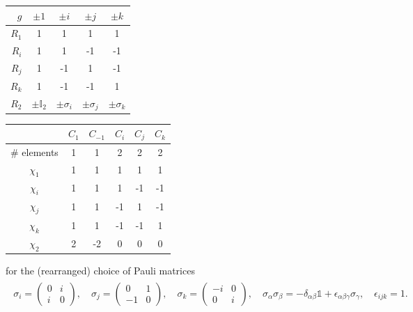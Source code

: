 \noindent
\begin{minipage}[t]{0.49\textwidth}
\centering
\begin{tabular}{|r||c|c|c|c|}
\hline
$g$ & $\pm 1$ & $\pm i$ & $\pm j$ & $\pm k$ \\
\hline\hline
$R_{1}$ & 1 & 1 & 1 & 1 \\
\hline
$R_{i}$ & 1 & 1 & -1 & -1 \\
\hline
$R_{j}$ & 1 & -1 & 1 & -1 \\
\hline
$R_{k}$ & 1 & -1 & -1 & 1 \\
\hline
$R_{2}$ & $\pm \mathbb{I}_{2}$ & $\pm \sigma_i$ & $\pm \sigma_j$ & $\pm \sigma_k$ \\
\hline
\end{tabular}
\end{minipage}\hfill
\begin{minipage}[t]{0.49\textwidth}
\centering
\begin{tabular}{|c|c|c|c|c|c|}
\hline
 & $C_{1}$ & $C_{-1}$ & $C_{i}$ & $C_{j}$ & $C_{k}$ \\
\hline
\# elements & 1 & 1 & 2 & 2 & 2 \\
\hline\hline
$\chi_{1}$ & 1 & 1 & 1 & 1 & 1 \\
\hline
$\chi_{i}$ & 1 & 1 & 1 & -1 & -1 \\
\hline
$\chi_{j}$ & 1 & 1 & -1 & 1 & -1 \\
\hline
$\chi_{k}$ & 1 & 1 & -1 & -1 & 1 \\
\hline
$\chi_{2}$ & 2 & -2 & 0 & 0 & 0 \\
\hline
\end{tabular}
\end{minipage}
for the (rearranged) choice of Pauli matrices 
\begin{align}
\begin{aligned}
  \sigma_{i}=\begin{pmatrix}
        0 & i \\
        i & 0
    \end{pmatrix} , \quad
    \sigma_{j}=\begin{pmatrix}
        0 & 1 \\
        -1 & 0
    \end{pmatrix} , \quad
    \sigma_k=\begin{pmatrix}
        -i & 0 \\
        0 & i
    \end{pmatrix},\quad \sigma_\alpha\sigma_\beta =-\delta_{\alpha\beta}\mathbb{1}+ \epsilon_{\alpha\beta\gamma}\sigma_\gamma , \quad \epsilon_{ijk}=1 .
\end{aligned}
\end{align}




